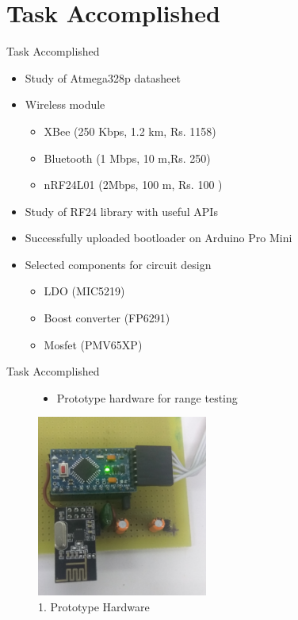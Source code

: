 \documentclass[10pt, a4paper]{beamer}
\begin{document}
\section{Task Accomplished}
\begin{frame}{Task Accomplished}
	\begin{itemize}
		\item  Study of Atmega328p datasheet
         \item Wireless module
    	  \begin{itemize}
    	     \item XBee (250 Kbps, 1.2 km, Rs. 1158)
     		 \item Bluetooth (1 Mbps, 10 m,Rs. 250)
     		 \item nRF24L01 (2Mbps, 100 m, Rs. 100 )
        
         \end{itemize}
        \item Study of RF24 library with useful APIs
        \item Successfully uploaded bootloader on Arduino Pro Mini
        \item Selected components for circuit design
        \begin{itemize}
        \item LDO (MIC5219)
        \item  Boost converter (FP6291)
    	\item Mosfet (PMV65XP)
        
        \end{itemize}
        
 \end{itemize}

\end{frame}

\begin{frame}{Task Accomplished}
\begin{figure}
\begin{itemize}
\item Prototype hardware for range testing
\end{itemize}
\begin{center}
\includegraphics[width=0.5\textwidth]{IMG_20180605_144752.jpg}
\caption{1. Prototype Hardware}
\end{center}
\end{figure}

\end{frame}
\end{document}
